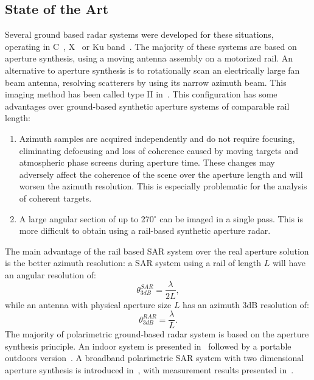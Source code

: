 \subsection{State of the Art}
Several ground based radar systems were developed for these situations, operating in C~\cite{Leva2003, Rudolf1999a,Kang2009}, X~\cite{Aguasca2004,Pipia2007a} or Ku band~\cite{Leva2003, Rudolf1999a,Werner2008, Rodelsperger2012}. The majority of these systems are based on aperture synthesis, using a moving antenna assembly on a motorized rail. 
An alternative to aperture synthesis is to rotationally scan an electrically large fan beam antenna, resolving  scatterers by using its narrow azimuth beam\cite{Werner2008,werner_gpri_2012}. This imaging method has been called type II in~\cite{Caduff2015}. 
This configuration has some advantages over ground-based synthetic aperture systems\cite{Monserrat2014} of comparable rail length: \begin{enumerate}
  \item Azimuth samples are acquired independently and do not require focusing, eliminating defocusing and loss of coherence caused by moving targets and atmospheric phase screens during aperture time. 
These changes may adversely affect the coherence of the scene over the aperture length and will worsen the azimuth resolution. This is especially problematic for the analysis of coherent targets.\\
 \item A large 
angular section of up to 270$^{\circ}$ can be imaged in a single pass. This is more difficult to obtain using a rail-based synthetic aperture radar.\\
\end{enumerate}
The main advantage of the rail based SAR system over the real aperture solution is the better azimuth resolution: a SAR system using a rail of length $L$ will have an angular resolution of: 
\begin{equation}
 	\theta_{3dB}^{SAR} = \frac{\lambda}{2L},
\end{equation}
while an antenna with physical aperture size $L$ has an azimuth 3dB resolution of:
\begin{equation}
 	\theta_{3dB}^{RAR} = \frac{\lambda}{L}.
\end{equation}
The majority of polarimetric ground-based radar system is based on the aperture synthesis principle. An indoor system is presented in~\cite{Bennett1996} followed by a portable outdoors version~\cite{Bennett2000}. A broadband polarimetric SAR system with two dimensional aperture synthesis is introduced in~\cite{Zhou2004}, with measurement results presented in~\cite{Hamasaki2005}.
